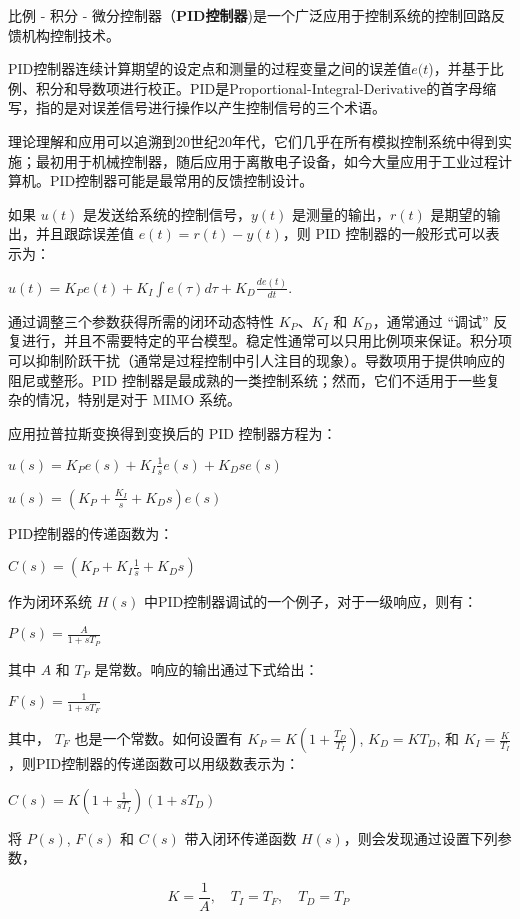 比例 - 积分 - 微分控制器（\textbf{PID控制器})是一个广泛应用于控制系统的控制回路反馈机构控制技术。

PID控制器连续计算期望的设定点和测量的过程变量之间的误差值$e(t$)，并基于比例、积分和导数项进行校正。PID是Proportional-Integral-Derivative的首字母缩写，指的是对误差信号进行操作以产生控制信号的三个术语。

理论理解和应用可以追溯到20世纪20年代，它们几乎在所有模拟控制系统中得到实施；最初用于机械控制器，随后应用于离散电子设备，如今大量应用于工业过程计算机。PID控制器可能是最常用的反馈控制设计。

如果 $u(t)$ 是发送给系统的控制信号，$y(t)$ 是测量的输出，$r(t)$ 是期望的输出，并且跟踪误差值 $e(t) = r(t) - y(t)$，则 PID 控制器的一般形式可以表示为：

$u(t) = K_P e(t) + K_I \int e(\tau) d\tau + K_D \frac{d e(t)}{dt}.$

通过调整三个参数获得所需的闭环动态特性 $K_P$、$K_I$ 和 $K_D$，通常通过 “调试” 反复进行，并且不需要特定的平台模型。稳定性通常可以只用比例项来保证。积分项可以抑制阶跃干扰（通常是过程控制中引人注目的现象）。导数项用于提供响应的阻尼或整形。PID 控制器是最成熟的一类控制系统；然而，它们不适用于一些复杂的情况，特别是对于 MIMO 系统。

应用拉普拉斯变换得到变换后的 PID 控制器方程为：

$u(s) = K_P e(s) + K_I \frac{1}{s} e(s) + K_D s e(s)$


$u(s) = \left(K_P + \frac{K_I}{s} + K_D s \right) e(s)$

PID控制器的传递函数为：

$C(s) = \left( K_P + K_I \frac{1}{s} + K_D s \right)$

作为闭环系统 $H(s)$ 中PID控制器调试的一个例子，对于一级响应，则有：

$P(s) = \frac{A}{1 + sT_P}$

其中 $A$ 和 $T_P$ 是常数。响应的输出通过下式给出：

$F(s) = \frac{1}{1 + sT_F}$

其中， $T_F$ 也是一个常数。如何设置有 $K_P = K \left( 1 + \frac{T_D}{T_I} \right)$, $K_D = K T_D$, 和 $K_I =\frac{K}{T_I}$，则PID控制器的传递函数可以用级数表示为：

$C(s) = K \left( 1 + \frac{1}{s T_I} \right) (1 + s T_D)$

将 $P(s)$, $F(s)$ 和 $C(s)$ 带入闭环传递函数 $H(s)$，则会发现通过设置下列参数，

\begin{equation}
K = \frac{1}{A}, \quad T_I = T_F, \quad T_D = T_P~
\end{equation}

